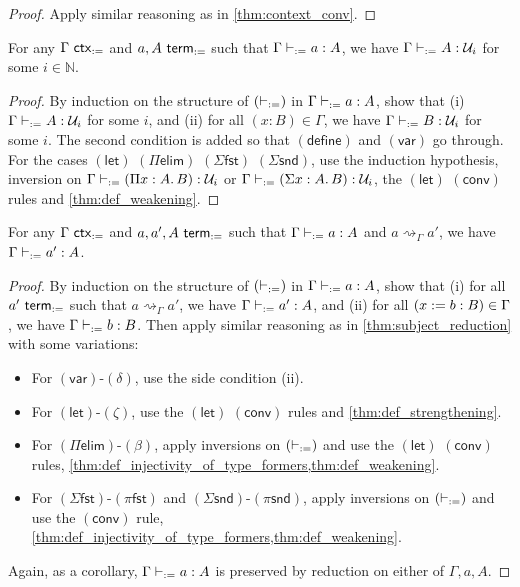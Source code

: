 \documentclass[twoside]{report}
\begin{document}
\begin{proof}
    Apply similar reasoning as in \cref{thm:context_conv}.
\end{proof}

\begin{proposition}[Classification]
    \label{thm:def_classification}
    For any $\Gamma \ \mathsf{ctx}_{:=}$ and $a, A \ \mathsf{term}_{:=}$ such that $\Gamma \vdash_{:=} a : A$, we have $\Gamma \vdash_{:=} A : \mathcal U_i$ for some $i \in \mathbb N$.
\end{proposition}

\begin{proof}
    By induction on the structure of $(\vdash_{:=})$ in $\Gamma \vdash_{:=} a : A$, show that (i) $\Gamma \vdash_{:=} A : \mathcal U_i$ for some $i$, and (ii) for all $(x : B) \in \Gamma$, we have $\Gamma \vdash_{:=} B : \mathcal U_i$ for some $i$. The second condition is added so that $(\mathsf{define})$ and $(\mathsf{var})$ go through. For the cases $(\mathsf{let})$ $(\Pi\mathsf{elim})$ $(\Sigma\mathsf{fst})$ $(\Sigma\mathsf{snd})$, use the induction hypothesis, inversion on $\Gamma \vdash_{:=} (\Pi{x} : {A}.\,{B}) : \mathcal U_i$ or $\Gamma \vdash_{:=} (\Sigma{x} : {A}.\,{B}) : \mathcal U_i$, the $(\mathsf{let})$ $(\mathsf{conv})$ rules and \cref{thm:def_weakening}.
\end{proof}

\begin{proposition}
    \label{thm:def_subject_reduction}
    For any $\Gamma \ \mathsf{ctx}_{:=}$ and $a, a', A \ \mathsf{term}_{:=}$ such that $\Gamma \vdash_{:=} a : A$ and $a \rightsquigarrow_\Gamma a'$, we have $\Gamma \vdash_{:=} a' : A$.
\end{proposition}

\begin{proof}
    By induction on the structure of $(\vdash_{:=})$ in $\Gamma \vdash_{:=} a : A$, show that (i) for all $a' \ \mathsf{term}_{:=}$ such that $a \rightsquigarrow_\Gamma a'$, we have $\Gamma \vdash_{:=} a' : A$, and (ii) for all $(x := b : B) \in \Gamma$, we have $\Gamma \vdash_{:=} b : B$. Then apply similar reasoning as in \cref{thm:subject_reduction} with some variations:
    \begin{itemize}[noitemsep]
        \item For $(\mathsf{var})$-$(\delta)$, use the side condition (ii).
        \item For $(\mathsf{let})$-$(\zeta)$, use the $(\mathsf{let})$ $(\mathsf{conv})$ rules and \cref{thm:def_strengthening}.
        \item For $(\Pi\mathsf{elim})$-$(\mathsf{\beta})$, apply inversions on $(\vdash_{:=})$ and use the $(\mathsf{let})$ $(\mathsf{conv})$ rules, \cref{thm:def_injectivity_of_type_formers,thm:def_weakening}.
        \item For $(\Sigma\mathsf{fst})$-$(\mathsf{\pi{fst}})$ and $(\Sigma\mathsf{snd})$-$(\mathsf{\pi{snd}})$, apply inversions on $(\vdash_{:=})$ and use the $(\mathsf{conv})$ rule, \cref{thm:def_injectivity_of_type_formers,thm:def_weakening}.
    \end{itemize}
    Again, as a corollary, $\Gamma \vdash_{:=} a : A$ is preserved by reduction on either of $\Gamma, a, A$.
\end{proof}
\end{document}
